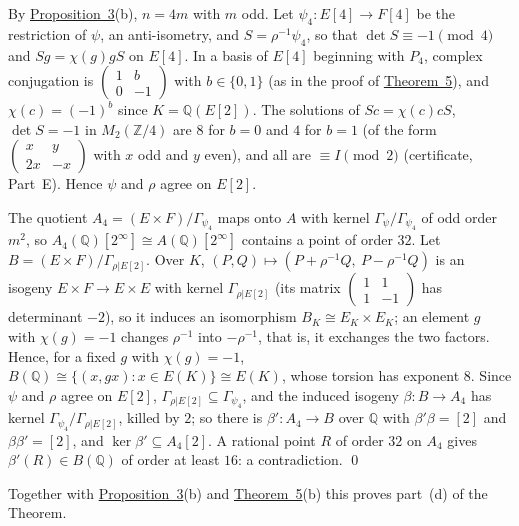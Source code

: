 \documentclass[11pt]{article}
\newcommand{\Q}{\mathbb Q}
\newcommand{\Z}{\mathbb Z}
\begin{document}
By \hyperref[prop-parents]{Proposition~3}(b), \(n=4m\) with \(m\) odd. Let \(\psi_4\colon E[4]\to F[4]\) be the
restriction of \(\psi\), an anti-isometry, and \(S=\rho^{-1}\psi_4\), so that \(\det S\equiv-1\pmod4\) and
\(Sg=\chi(g)gS\) on \(E[4]\). In a basis of \(E[4]\) beginning with \(P_4\), complex conjugation is
\(\left(\begin{smallmatrix}1&b\\0&-1\end{smallmatrix}\right)\) with \(b\in\{0,1\}\) (as in the proof of
\hyperref[thm-isotypic]{Theorem~5}), and \(\chi(c)=(-1)^b\) since \(K=\Q(E[2])\). The solutions of
\(Sc=\chi(c)cS\), \(\det S=-1\) in \(M_2(\Z/4)\) are \(8\) for \(b=0\) and \(4\) for \(b=1\) (of the form
\(\left(\begin{smallmatrix}x&y\\2x&-x\end{smallmatrix}\right)\) with \(x\) odd and \(y\) even), and all are \(\equiv I
\pmod2\) (certificate, Part~E). Hence \(\psi\) and \(\rho\) agree on \(E[2]\).

The quotient \(A_4=(E\times F)/\Gamma_{\psi_4}\) maps onto \(A\) with kernel \(\Gamma_\psi/\Gamma_{\psi_4}\) of odd
order \(m^2\), so \(A_4(\Q)[2^\infty]\cong A(\Q)[2^\infty]\) contains a point of order \(32\). Let
\(B=(E\times F)/\Gamma_{\rho|E[2]}\). Over \(K\), \((P,Q)\mapsto(P+\rho^{-1}Q,\ P-\rho^{-1}Q)\) is an isogeny
\(E\times F\to E\times E\) with kernel \(\Gamma_{\rho|E[2]}\) (its matrix \(\left(\begin{smallmatrix}1&1\\1&-1
\end{smallmatrix}\right)\) has determinant \(-2\)), so it induces an isomorphism \(B_K\cong E_K\times E_K\); an
element \(g\) with \(\chi(g)=-1\) changes \(\rho^{-1}\) into \(-\rho^{-1}\), that is, it exchanges the two factors.
Hence, for a fixed \(g\) with \(\chi(g)=-1\), \(B(\Q)\cong\{(x,gx):x\in E(K)\}\cong E(K)\), whose torsion has
exponent \(8\). Since \(\psi\) and \(\rho\)
agree on \(E[2]\), \(\Gamma_{\rho|E[2]}\subseteq\Gamma_{\psi_4}\), and the induced isogeny \(\beta\colon B\to A_4\) has
kernel \(\Gamma_{\psi_4}/\Gamma_{\rho|E[2]}\), killed by \(2\); so there is \(\beta'\colon A_4\to B\) over \(\Q\) with
\(\beta'\beta=[2]\) and \(\beta\beta'=[2]\), and \(\ker\beta'\subseteq A_4[2]\). A rational point \(R\) of order
\(32\) on \(A_4\) gives \(\beta'(R)\in B(\Q)\) of order at least \(16\): a contradiction. \qed

\medskip
Together with \hyperref[prop-parents]{Proposition~3}(b) and \hyperref[thm-isotypic]{Theorem~5}(b) this proves
part~(d) of the Theorem.
\end{document}
